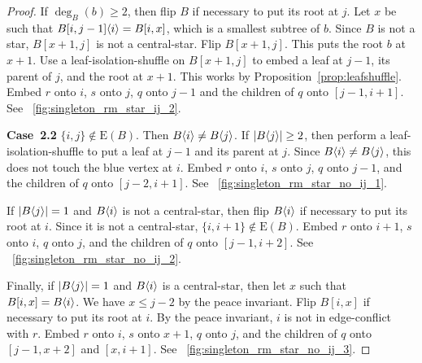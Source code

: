 \documentclass[11pt,a4paper,colorlinks=true,urlcolor=blue,citecolor=red]{article}
\theoremstyle{plain}
\newcommand{\case}[1]{\par\vspace{.5\baselineskip}\noindent\textbf{\sffamily Case~#1}}
\newcommand{\EB}{\mathrm{E}(B)}
\begin{document}
\begin{proof}
  If $\deg_B(b)\geq2$, then flip $B$ if necessary to put its root
  at $j$. Let $x$ be such that $B{[i,j-1]}\langle{i}\rangle=B[i,x]$, which is
  a smallest subtree of $b$. Since $B$ is not a star, $B[x+1,j]$
  is not a central-star. Flip $B[x+1,j]$. This
  puts the root $b$ at $x+1$. Use a leaf-isolation-shuffle on $B[x+1,j]$
  to embed a leaf at $j-1$, its parent of $j$, and the root at $x+1$.
  This works by Proposition~\ref{prop:leafshuffle}. Embed $r$ onto $i$,
  $s$ onto $j$, $q$ onto $j-1$ and the children of $q$ onto $[j-1,i+1]$.
  See \figurename~\ref{fig:singleton_rm_star_ij_2}.

  \case{2.2} $\{i,j\}\not\in\EB$. Then $B\langle{i}\rangle\neq B\langle{j}\rangle$. If
  $|B\langle{j}\rangle|\geq2$, then perform a leaf-isolation-shuffle to put a
  leaf at $j-1$ and its parent at $j$. Since $B\langle{i}\rangle\neq B\langle{j}\rangle$,
  this does not touch the blue vertex at $i$. Embed $r$ onto $i$, $s$
  onto $j$, $q$ onto $j-1$, and the children of $q$ onto $[j-2,i+1]$.
  See \figurename~\ref{fig:singleton_rm_star_no_ij_1}.

  If $|B\langle{j}\rangle|=1$ and $B\langle{i}\rangle$ is not a central-star, then
  flip $B\langle{i}\rangle$ if necessary to put its root at $i$. Since it is
  not a central-star, $\{i,i+1\}\not\in\EB$. Embed $r$ onto $i+1$, $s$
  onto $i$, $q$ onto $j$, and the children of $q$ onto $[j-1,i+2]$. See
  \figurename~\ref{fig:singleton_rm_star_no_ij_2}.

  Finally, if $|B\langle{j}\rangle|=1$ and $B\langle{i}\rangle$ is a central-star, then
  let $x$ such that $B[i,x]=B\langle{i}\rangle$. We have $x\leq j-2$ by the
  peace invariant. Flip $B[i,x]$ if necessary to put its root
  at $i$. By the peace invariant, $i$ is not in edge-conflict
  with $r$. Embed $r$ onto $i$, $s$ onto $x+1$, $q$ onto $j$, and the
  children of $q$ onto $[j-1,x+2]$ and $[x,i+1]$. See
  \figurename~\ref{fig:singleton_rm_star_no_ij_3}.
\end{proof}
\end{document}
